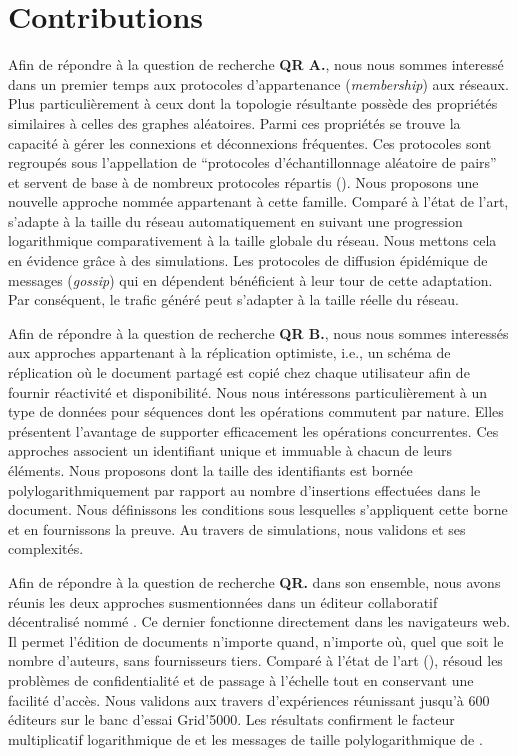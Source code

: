 
\section{Contributions}


Afin de répondre à la question de recherche \textbf{QR A.}, nous nous sommes
interessé dans un premier temps aux protocoles d'appartenance
(\emph{membership}) aux réseaux. Plus particulièrement à ceux dont la topologie
résultante possède des propriétés similaires à celles des graphes
aléatoires. Parmi ces propriétés se trouve la capacité à gérer les connexions et
déconnexions fréquentes. Ces protocoles sont regroupés sous l'appellation de
``protocoles d'échantillonnage aléatoire de pairs'' et servent de base à de
nombreux protocoles répartis (\REF). Nous proposons une nouvelle approche nommée
\SPRAY appartenant à cette famille. Comparé à l'état de l'art, \SPRAY s'adapte à
la taille du réseau automatiquement en suivant une progression logarithmique
comparativement à la taille globale du réseau. Nous mettons cela en évidence
grâce à des simulations.  Les protocoles de diffusion épidémique de messages
(\emph{gossip}) qui en dépendent bénéficient à leur tour de cette
adaptation. Par conséquent, le trafic généré peut s'adapter à la taille réelle
du réseau.

Afin de répondre à la question de recherche \textbf{QR B.}, nous nous sommes
interessés aux approches appartenant à la réplication optimiste, i.e., un schéma
de réplication où le document partagé est copié chez chaque utilisateur afin de
fournir réactivité et disponibilité. Nous nous intéressons particulièrement à un
type de données pour séquences dont les opérations commutent par nature. Elles
présentent l'avantage de supporter efficacement les opérations concurrentes. Ces
approches associent un identifiant unique et immuable à chacun de leurs
éléments. Nous proposons \LSEQ dont la taille des identifiants est bornée
polylogarithmiquement par rapport au nombre d'insertions effectuées dans le
document. Nous définissons les conditions sous lesquelles s'appliquent cette
borne et en fournissons la preuve. Au travers de simulations, nous validons
\LSEQ et ses complexités.

Afin de répondre à la question de recherche \textbf{QR.} dans son ensemble, nous
avons réunis les deux approches susmentionnées dans un éditeur collaboratif
décentralisé nommé \CRATE. Ce dernier fonctionne directement dans les
navigateurs web. Il permet l'édition de documents n'importe quand, n'importe où,
quel que soit le nombre d'auteurs, sans fournisseurs tiers. Comparé à l'état de
l'art (\REF), \CRATE résoud les problèmes de confidentialité et de passage à
l'échelle tout en conservant une facilité d'accès. Nous validons \CRATE aux
travers d'expériences réunissant jusqu'à 600 éditeurs sur le banc d'essai
Grid'5000. Les résultats confirment le facteur multiplicatif logarithmique de
\SPRAY et les messages de taille polylogarithmique de \LSEQ.



